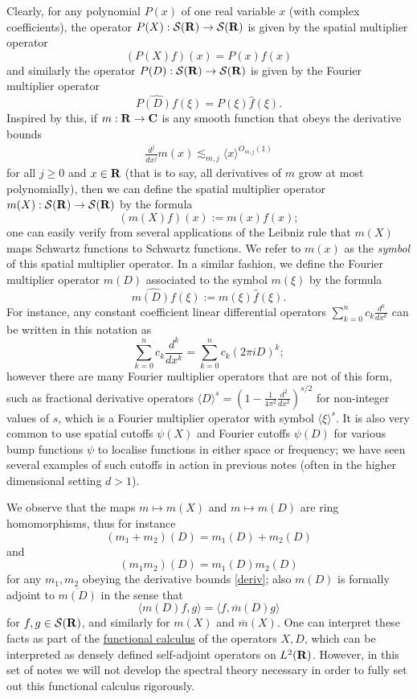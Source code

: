 \documentclass[11pt]{article}
\theoremstyle{definition}
\begin{document}
Clearly, for any polynomial \({P(x)}\) of one real variable \({x}\) (with complex coefficients), the operator \({P(X): {\mathcal S}({\bf R}) \rightarrow {\mathcal S}({\bf R})}\) is given by the spatial multiplier operator 
\[\displaystyle  (P(X) f)(x) = P(x) f(x)\]
 and similarly the operator \({P(D): {\mathcal S}({\bf R}) \rightarrow {\mathcal S}({\bf R})}\) is given by the Fourier multiplier operator 
\[\displaystyle  \widehat{P(D) f}(\xi) = P(\xi) \hat f(\xi).\]
 Inspired by this, if \({m: {\bf R} \rightarrow {\bf C}}\) is any smooth function that obeys the derivative bounds 
\begin{align}\label{deriv}
  \frac{d^j}{dx^j} m(x) \lesssim_{m,j} \langle x \rangle^{O_{m,j}(1)} 
\end{align}
 for all \({j \geq 0}\) and \({x \in {\bf R}}\) (that is to say, all derivatives of \({m}\) grow at most polynomially), then we can define the spatial multiplier operator \({m(X): {\mathcal S}({\bf R}) \rightarrow {\mathcal S}({\bf R})}\) by the formula 
\[\displaystyle  (m(X) f)(x) := m(x) f(x);\]
 one can easily verify from several applications of the Leibniz rule that \({m(X)}\) maps Schwartz functions to Schwartz functions. We refer to \({m(x)}\) as the \emph{symbol} of this spatial multiplier operator. In a similar fashion, we define the Fourier multiplier operator \({m(D)}\) associated to the symbol \({m(\xi)}\) by the formula 
\[\displaystyle  \widehat{m(D) f}(\xi) := m(\xi) \hat f(\xi).\]
 For instance, any constant coefficient linear differential operators \({\sum_{k=0}^n c_k \frac{d^k}{dx^k}}\) can be written in this notation as 
\[\displaystyle \sum_{k=0}^n c_k \frac{d^k}{dx^k} =\sum_{k=0}^n c_k (2\pi i D)^k;\]
 however there are many Fourier multiplier operators that are not of this form, such as fractional derivative operators \({\langle D \rangle^s = (1- \frac{1}{4\pi^2} \frac{d^2}{dx^2})^{s/2}}\) for non-integer values of \({s}\), which is a Fourier multiplier operator with symbol \({\langle \xi \rangle^s}\). It is also very common to use spatial cutoffs \({\psi(X)}\) and Fourier cutoffs \({\psi(D)}\) for various bump functions \({\psi}\) to localise functions in either space or frequency; we have seen several examples of such cutoffs in action in previous notes (often in the higher dimensional setting \({d>1}\)).

We observe that the maps \({m \mapsto m(X)}\) and \({m \mapsto m(D)}\) are ring homomorphisms, thus for instance 
\[\displaystyle  (m_1 + m_2)(D) = m_1(D) + m_2(D)\]
 and 
\[\displaystyle  (m_1 m_2)(D) = m_1(D) m_2(D)\]
 for any \({m_1,m_2}\) obeying the derivative bounds \eqref{deriv}; also \({m(D)}\) is formally adjoint to \({\overline{m(D)}}\) in the sense that 
\[\displaystyle  \langle m(D) f, g \rangle = \langle f, \overline{m}(D) g \rangle\]
 for \({f,g \in {\mathcal S}({\bf R})}\), and similarly for \({m(X)}\) and \({\overline{m}(X)}\). One can interpret these facts as part of the \href{https://en.wikipedia.org/wiki/Functional_calculus}{functional calculus} of the operators \({X,D}\), which can be interpreted as densely defined self-adjoint operators on \({L^2({\bf R})}\). However, in this set of notes we will not develop the spectral theory necessary in order to fully set out this functional calculus rigorously.
\end{document}
